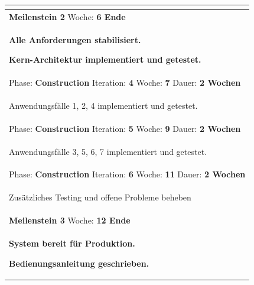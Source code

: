 \documentclass[11pt,ngerman]{article}
\begin{document}
\begin{tabularx}{\textwidth}{X}
\begin{compactitem}
	\end{compactitem}\\
	\toprule
	\rowcolor{lightgray}
	\textbf{Meilenstein 2} Woche: \textbf{6 Ende}\\
	\rowcolor{lightgray}
	\begin{compactitem}
		\item \textbf{Alle Anforderungen stabilisiert.}
		\item \textbf{Kern-Architektur implementiert und getestet.}
	\end{compactitem}\\
	\toprule
	Phase: \textbf{Construction} Iteration: \textbf{4} Woche: \textbf{7} Dauer: \textbf{2 Wochen}\\
	\begin{compactitem}
		\item Anwendungsfälle 1, 2, 4 implementiert und getestet.
	\end{compactitem}\\
	\toprule
	Phase: \textbf{Construction} Iteration: \textbf{5} Woche: \textbf{9} Dauer: \textbf{2 Wochen}\\
	\begin{compactitem}
		\item Anwendungsfälle 3, 5, 6, 7 implementiert und getestet.
	\end{compactitem}\\
	\toprule
	Phase: \textbf{Construction} Iteration: \textbf{6} Woche: \textbf{11} Dauer: \textbf{2 Wochen}\\
	\begin{compactitem}
		\item Zusätzliches Testing und offene Probleme beheben
	\end{compactitem}\\
	\toprule
	\rowcolor{lightgray}
	\textbf{Meilenstein 3} Woche: \textbf{12 Ende}\\
	\rowcolor{lightgray}
	\begin{compactitem}
		\item \textbf{System bereit für Produktion.}
		\item \textbf{Bedienungsanleitung geschrieben.}
	\end{compactitem}\\
	\bottomrule
\end{tabularx}
\end{document}
